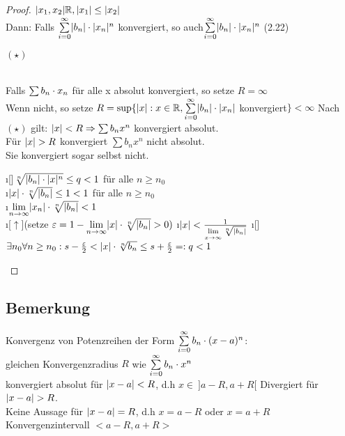 \begin{proof}
$\lvert x_1,x_2 \rvert \mathbb{R}, \lvert x_1 \rvert \leq \lvert x_2 \rvert$\\
Dann: Falls $\sum\limits_{i=0}^{\infty} \lvert b_n \rvert \cdot \lvert x_n \rvert^n$ konvergiert, so auch$ \sum\limits_{i=0}^{\infty} \lvert b_n \rvert \cdot \lvert x_n \rvert^n$ (2.22) \begin{huge}
$(\star)$
\end{huge}\\
Falls $\sum b_n \cdot x_n$ für alle x absolut konvergiert, so setze $R= \infty$\\
Wenn nicht, so setze $R = \sup \{\lvert x \rvert:x\in \mathbb{R}, \sum\limits_{i=0}^{\infty} \lvert b_n \rvert\cdot \lvert x_n \rvert $ konvergiert$ \} < \infty$
Nach $(\star)$ gilt: $\lvert x \rvert < R \Rightarrow \sum b_nx^n$ konvergiert absolut.\\
Für $\lvert x \rvert > R$ konvergiert $\sum b_nx^n$ nicht absolut.\\
Sie konvergiert sogar selbst nicht. \\
\begin{enumerate}[$\Leftrightarrow$]
\i[]$\sqrt[n]{\lvert b_n \rvert \cdot \lvert x \rvert^n} \leq q < 1 $ für alle $n \geq n_0$\\
\i $\lvert x \rvert \cdot \sqrt[n]{\lvert b_n \rvert} \leq 1 < 1$ für alle $n \geq n_0$\\
\i $\lim\limits_{n \rightarrow \infty} \lvert x_n \rvert \cdot \sqrt[n]{\lvert b_n \rvert} < 1$\\
\i[$\uparrow$](setze $\varepsilon = 1 - \lim\limits_{n \rightarrow \infty} \lvert x \rvert \cdot \sqrt[n]{\lvert b_n \rvert} > 0)$
\i $\lvert x \rvert < \frac{1}{\lim\limits_{x \rightarrow \infty} \sqrt[n]{\lvert b_n \rvert}}$
\i[] $\exists n_0 \forall n \geq n_0 : s - \frac{\varepsilon}{2} < \lvert x \rvert \cdot \sqrt[n]{b_n} \leq s + \frac{\varepsilon}{2} =: q < 1$
\end{enumerate}

 
\end{proof}
\subsection{Bemerkung}
Konvergenz von Potenzreihen der Form $\sum\limits_{i=0}^{\infty} b_n \cdot (x-a)^n$:\\
gleichen Konvergenzradius $R$ wie $\sum\limits_{i=0}^{\infty} b_n \cdot x^n$\\
konvergiert absolut für $\lvert x-a \rvert < R$, d.h $x \in \ ]a-R,  a+R[$
Divergiert für $\lvert x-a \rvert > R$.\\
Keine Aussage für $\lvert x-a \rvert = R$, d.h $ x = a-R$ oder $x = a+R$\\
Konvergenzintervall $<a-R,a+R>$
